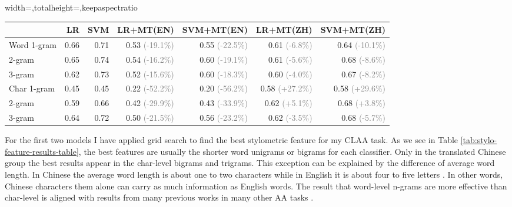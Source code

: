 \documentclass[11pt,a4paper]{article}
\begin{document}
\begin{table*}[t]
  \begin{center}
  \begin{adjustbox}{width={\textwidth},totalheight={\textheight},keepaspectratio}%
  \begin{tabular}{|l|r|r|r|r|r|r|}
  \hline & \bf LR & \bf SVM & \bf LR+MT(EN) & \bf SVM+MT(EN) & \bf LR+MT(ZH) & \bf SVM+MT(ZH) \\ \hline
  Word 1-gram & 0.66 & 0.71 & 0.53 \textcolor{gray}{(-19.1\%)} & 0.55 \textcolor{gray}{(-22.5\%)} & 0.61 \textcolor{gray}{(-6.8\%)} & 0.64 \textcolor{gray}{(-10.1\%)} \\
  \hspace{0.5cm} 2-gram & 0.65 & 0.74 & 0.54 \textcolor{gray}{(-16.2\%)} & 0.60 \textcolor{gray}{(-19.1\%)} & 0.61 \textcolor{gray}{(-5.6\%)} & 0.68 \textcolor{gray}{(-8.6\%)} \\
  \hspace{0.5cm} 3-gram & 0.62 & 0.73 & 0.52 \textcolor{gray}{(-15.6\%)} & 0.60 \textcolor{gray}{(-18.3\%)} & 0.60 \textcolor{gray}{(-4.0\%)} & 0.67 \textcolor{gray}{(-8.2\%)} \\
  Char 1-gram & 0.45 & 0.45 & 0.22 \textcolor{gray}{(-52.2\%)} & 0.20 \textcolor{gray}{(-56.2\%)} & 0.58 \textcolor{gray}{(+27.2\%)} & 0.58 \textcolor{gray}{(+29.6\%)} \\
  \hspace{0.5cm} 2-gram & 0.59 & 0.66 & 0.42 \textcolor{gray}{(-29.9\%)} & 0.43 \textcolor{gray}{(-33.9\%)} & 0.62 \textcolor{gray}{(+5.1\%)} & 0.68 \textcolor{gray}{(+3.8\%)} \\
  \hspace{0.5cm} 3-gram & 0.64 & 0.72 & 0.50 \textcolor{gray}{(-21.5\%)} & 0.56 \textcolor{gray}{(-23.2\%)} & 0.62 \textcolor{gray}{(-3.5\%)} & 0.68 \textcolor{gray}{(-5.7\%)} \\
  \hline
  \end{tabular}
\end{adjustbox}
  \end{center}
  \caption{\label{tab:stylo-feature-results-table} Results for the Vanilla Model and the Machine Translation Model. Numbers in the brackets are the differences in percentage compared to the corresponding untranslated results.}
\end{table*}

For the first two models I have applied grid search to find the best stylometric feature for my CLAA task. As we see in Table \ref{tab:stylo-feature-results-table}, the best features are usually the shorter word unigrams or bigrams for each classifier. Only in the translated Chinese group the best results appear in the char-level bigrams and trigrams. This exception can be explained by the difference of average word length. In Chinese the average word length is about one to two characters while in English it is about four to five letters \cite{chen2015does} \cite{bochkarev2015average}. In other words, Chinese characters them alone can carry as much information as English words. The result that word-level n-grams are more effective than char-level is aligned with results from many previous works in many other AA tasks \cite{kestemont2018overview} \cite{rangel2019overview}.
\end{document}
